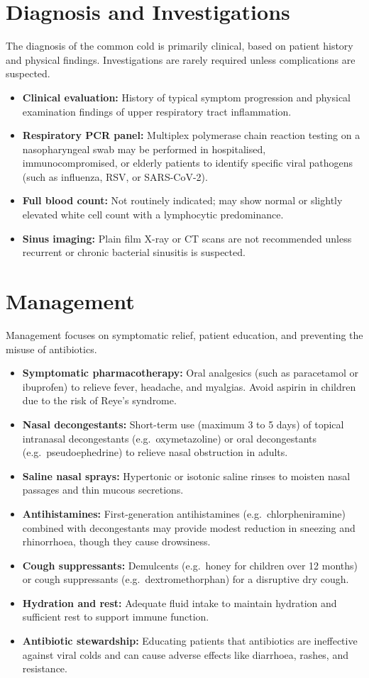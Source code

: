 \section*{Diagnosis and Investigations}
The diagnosis of the common cold is primarily clinical, based on patient history and physical findings. Investigations are rarely required unless complications are suspected.
\begin{itemize}
    \item \textbf{Clinical evaluation:} History of typical symptom progression and physical examination findings of upper respiratory tract inflammation.
    \item \textbf{Respiratory PCR panel:} Multiplex polymerase chain reaction testing on a nasopharyngeal swab may be performed in hospitalised, immunocompromised, or elderly patients to identify specific viral pathogens (such as influenza, RSV, or SARS-CoV-2).
    \item \textbf{Full blood count:} Not routinely indicated; may show normal or slightly elevated white cell count with a lymphocytic predominance.
    \item \textbf{Sinus imaging:} Plain film X-ray or CT scans are not recommended unless recurrent or chronic bacterial sinusitis is suspected.
\end{itemize}

\section*{Management}
Management focuses on symptomatic relief, patient education, and preventing the misuse of antibiotics.
\begin{itemize}
    \item \textbf{Symptomatic pharmacotherapy:} Oral analgesics (such as paracetamol or ibuprofen) to relieve fever, headache, and myalgias. Avoid aspirin in children due to the risk of Reye's syndrome.
    \item \textbf{Nasal decongestants:} Short-term use (maximum 3 to 5 days) of topical intranasal decongestants (e.g.\ oxymetazoline) or oral decongestants (e.g.\ pseudoephedrine) to relieve nasal obstruction in adults.
    \item \textbf{Saline nasal sprays:} Hypertonic or isotonic saline rinses to moisten nasal passages and thin mucous secretions.
    \item \textbf{Antihistamines:} First-generation antihistamines (e.g.\ chlorpheniramine) combined with decongestants may provide modest reduction in sneezing and rhinorrhoea, though they cause drowsiness.
    \item \textbf{Cough suppressants:} Demulcents (e.g.\ honey for children over 12 months) or cough suppressants (e.g.\ dextromethorphan) for a disruptive dry cough.
    \item \textbf{Hydration and rest:} Adequate fluid intake to maintain hydration and sufficient rest to support immune function.
    \item \textbf{Antibiotic stewardship:} Educating patients that antibiotics are ineffective against viral colds and can cause adverse effects like diarrhoea, rashes, and resistance.
\end{itemize}

